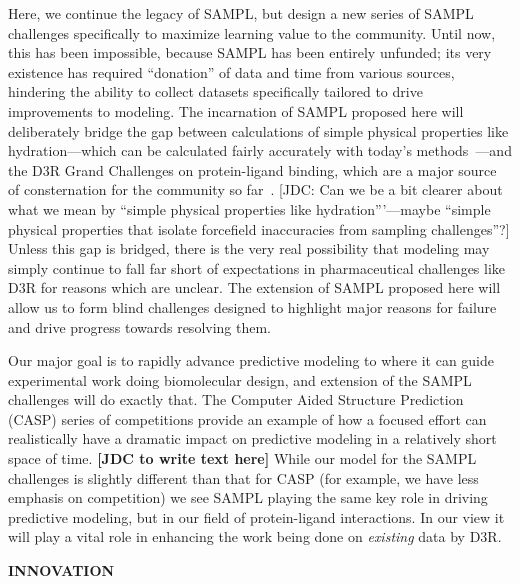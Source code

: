 \documentclass[11pt]{article}
\begin{document}
Here, we continue the legacy of SAMPL, but design a new series of SAMPL challenges specifically to maximize learning value to the community.
Until now, this has been impossible, because SAMPL has been entirely unfunded; its very existence has required ``donation'' of data and time from various sources, hindering the ability to collect datasets specifically tailored to drive improvements to modeling. 
The incarnation of SAMPL proposed here will deliberately bridge the gap between calculations of simple physical properties like hydration---which can be calculated fairly accurately with today's methods~\cite{mobley_blind_2014-1}---and the D3R Grand Challenges on protein-ligand binding, which are a major source of consternation for the community so far~\cite{ignjatovic_binding-affinity_2016, deng_large_2016, sunseri_d3r_2016, gathiaka_d3r_2016}.
{\color{red}[JDC: Can we be a bit clearer about what we mean by ``simple physical properties like hydration'''---maybe ``simple physical properties that isolate forcefield inaccuracies from sampling challenges''?]}
Unless this gap is bridged, there is the very real possibility that modeling may simply continue to fall far short of expectations in pharmaceutical challenges like D3R for reasons which are unclear.
The extension of SAMPL proposed here will allow us to form blind challenges designed to highlight major reasons for failure and drive progress towards resolving them.

Our major goal is to rapidly advance predictive modeling to where it can guide experimental work doing biomolecular design, and extension of the SAMPL challenges will do exactly that.
The Computer Aided Structure Prediction (CASP) series of competitions provide an example of how a focused effort can realistically have a dramatic impact on predictive modeling in a relatively short space of time.  {\bf [JDC to write text here]}
While our model for the SAMPL challenges is slightly different than that for CASP (for example, we have less emphasis on competition) we see SAMPL playing the same key role in driving predictive modeling, but in our field of protein-ligand interactions. 
In our view it will play a vital role in enhancing the work being done on \emph{existing} data by D3R. 



{\large \bf INNOVATION}
\end{document}
